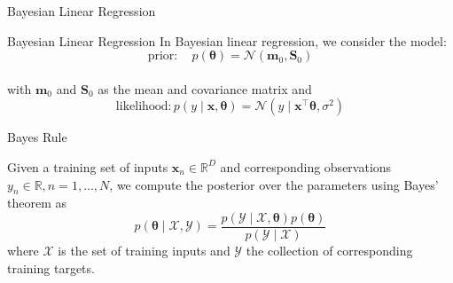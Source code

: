 \documentclass{beamer}
\begin{document}
\begin{frame}{Bayesian Linear Regression}
\end{frame}

\begin{frame}{Bayesian Linear Regression}
In Bayesian linear regression, we consider the model:\\
\begin{equation*} 
\textrm{prior}: \quad p(\boldsymbol{\theta})=\mathcal{N}\left(\boldsymbol{m}_0, \boldsymbol{S}_0\right)
\end{equation*}
\\with $\boldsymbol{m}_0$ and $\boldsymbol{S}_0$ as the mean and covariance matrix and
\begin{equation*}
\textrm{likelihood}: p(y \mid \boldsymbol{x}, \boldsymbol{\theta})=\mathcal{N}\left(y \mid \boldsymbol{\boldsymbol{x}}^{\top} \boldsymbol{\theta}, \sigma^2\right)
\end{equation*}
\end{frame}

\begin{frame}{Bayes Rule}

    Given a training set of inputs $\boldsymbol{x}_n \in \mathbb{R}^D$ and corresponding observations $y_n \in \mathbb{R}, n=1, \ldots, N$, we compute the posterior over the parameters using Bayes' theorem as
$$
p(\boldsymbol{\theta} \mid \mathcal{X}, \mathcal{Y})=\frac{p(\mathcal{Y} \mid \mathcal{X}, \boldsymbol{\theta}) p(\boldsymbol{\theta})}{p(\mathcal{Y} \mid \mathcal{X})}
$$
where $\mathcal{X}$ is the set of training inputs and $\mathcal{Y}$ the collection of corresponding training targets. 
\end{frame}
\end{document}
